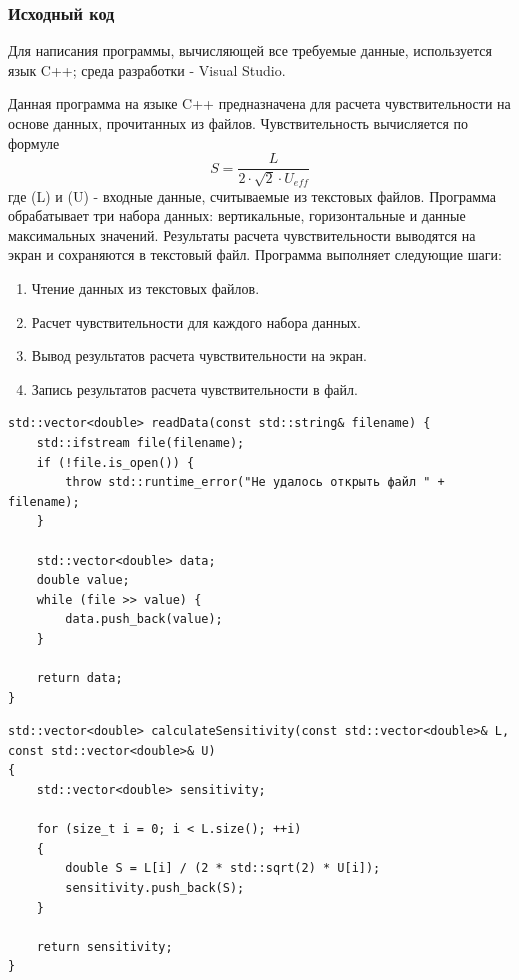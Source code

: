 \subsubsection{Исходный код}
Для написания программы, вычисляющей все требуемые данные, используется язык C++; среда разработки - Visual Studio.

Данная программа на языке C++ предназначена для расчета чувствительности на основе данных, прочитанных из файлов.  Чувствительность вычисляется по формуле 
\[
    S = \frac{L}{2 \cdot \sqrt{2} \cdot U_{eff}}
\]
где (L) и (U) - входные данные, считываемые из текстовых файлов.  Программа обрабатывает три набора данных: вертикальные, горизонтальные и данные максимальных значений.  Результаты расчета чувствительности выводятся на экран и сохраняются в текстовый файл.
Программа выполняет следующие шаги:
\begin{enumerate}
    \item Чтение данных из текстовых файлов.
    \item Расчет чувствительности для каждого набора данных.
    \item Вывод результатов расчета чувствительности на экран.
    \item Запись результатов расчета чувствительности в файл.
\end{enumerate}

\begin{lstlisting}[label=listing1, caption=Функция считывания данных из файла]
std::vector<double> readData(const std::string& filename) {
    std::ifstream file(filename);
    if (!file.is_open()) {
        throw std::runtime_error("Не удалось открыть файл " + filename);
    }

    std::vector<double> data;
    double value;
    while (file >> value) {
        data.push_back(value);
    }

    return data;
}

\end{lstlisting}

\begin{lstlisting}[label=listing2, caption=Функция расчета чувствительности]
std::vector<double> calculateSensitivity(const std::vector<double>& L, const std::vector<double>& U)
{
	std::vector<double> sensitivity;

	for (size_t i = 0; i < L.size(); ++i)
	{
		double S = L[i] / (2 * std::sqrt(2) * U[i]);
		sensitivity.push_back(S);
	}

	return sensitivity;
}
\end{lstlisting}

